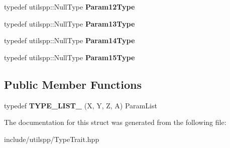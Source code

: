 \begin{DoxyCompactItemize}
\item 
\hypertarget{structutilspp_1_1PointerOnMemberFunction_3_01W_07V_1_1_5_08_07X_00_01Y_00_01Z_00_01A_08_4_af3f0c1ada34d12737e6754379db54a52}{typedef utilspp\-::\-Null\-Type {\bfseries Param12\-Type}}\label{structutilspp_1_1PointerOnMemberFunction_3_01W_07V_1_1_5_08_07X_00_01Y_00_01Z_00_01A_08_4_af3f0c1ada34d12737e6754379db54a52}

\item 
\hypertarget{structutilspp_1_1PointerOnMemberFunction_3_01W_07V_1_1_5_08_07X_00_01Y_00_01Z_00_01A_08_4_a451dd27f40fcdfad6a3741a598797db5}{typedef utilspp\-::\-Null\-Type {\bfseries Param13\-Type}}\label{structutilspp_1_1PointerOnMemberFunction_3_01W_07V_1_1_5_08_07X_00_01Y_00_01Z_00_01A_08_4_a451dd27f40fcdfad6a3741a598797db5}

\item 
\hypertarget{structutilspp_1_1PointerOnMemberFunction_3_01W_07V_1_1_5_08_07X_00_01Y_00_01Z_00_01A_08_4_adc86a6fc8cf4581d163f4de9645531cc}{typedef utilspp\-::\-Null\-Type {\bfseries Param14\-Type}}\label{structutilspp_1_1PointerOnMemberFunction_3_01W_07V_1_1_5_08_07X_00_01Y_00_01Z_00_01A_08_4_adc86a6fc8cf4581d163f4de9645531cc}

\item 
\hypertarget{structutilspp_1_1PointerOnMemberFunction_3_01W_07V_1_1_5_08_07X_00_01Y_00_01Z_00_01A_08_4_a14e802d408ab5453d934e6fa1b559ec4}{typedef utilspp\-::\-Null\-Type {\bfseries Param15\-Type}}\label{structutilspp_1_1PointerOnMemberFunction_3_01W_07V_1_1_5_08_07X_00_01Y_00_01Z_00_01A_08_4_a14e802d408ab5453d934e6fa1b559ec4}

\end{DoxyCompactItemize}
\subsection*{Public Member Functions}
\begin{DoxyCompactItemize}
\item 
\hypertarget{structutilspp_1_1PointerOnMemberFunction_3_01W_07V_1_1_5_08_07X_00_01Y_00_01Z_00_01A_08_4_ab47fd2bd4e8ff8b5e33c06015abc27be}{typedef {\bfseries T\-Y\-P\-E\-\_\-\-L\-I\-S\-T\-\_} (X, Y, Z, A) Param\-List}\label{structutilspp_1_1PointerOnMemberFunction_3_01W_07V_1_1_5_08_07X_00_01Y_00_01Z_00_01A_08_4_ab47fd2bd4e8ff8b5e33c06015abc27be}

\end{DoxyCompactItemize}


The documentation for this struct was generated from the following file\-:\begin{DoxyCompactItemize}
\item 
include/utilspp/Type\-Trait.\-hpp\end{DoxyCompactItemize}
